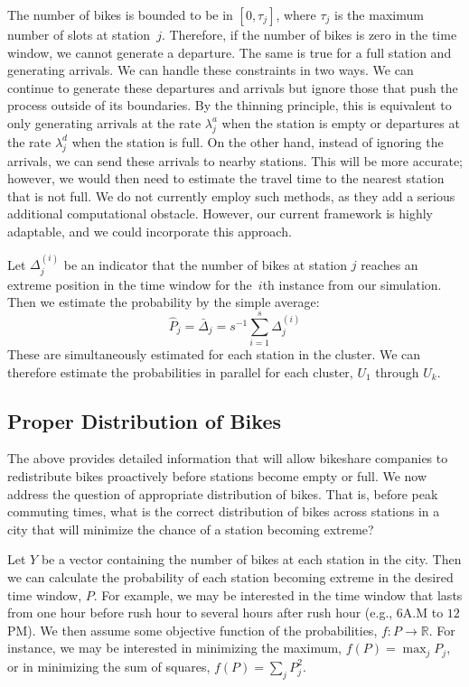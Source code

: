 \documentclass{acm_proc_article-sp}
\begin{document}
The number of bikes is bounded to be in $[0, \tau_j]$, where $\tau_j$ is the maximum number of slots at station~$j$.  Therefore, if the number of bikes is zero in the time window, we cannot generate a departure.  The same is true for a full station and generating arrivals.  We can handle these constraints in two ways.  We can continue to generate these departures and arrivals but ignore those that push the process outside of its boundaries.  By the thinning principle, this is equivalent to only generating arrivals at the rate $\lambda^{a}_j$ when the station is empty or departures at the rate $\lambda^{d}_j$ when the station is full.   On the other hand, instead of ignoring the arrivals, we can send these arrivals to nearby stations.  This will be more accurate; however, we would then need to estimate the travel time to the nearest station that is not full.  We do not currently employ such methods, as they add a serious additional computational obstacle.  However, our current framework is highly adaptable, and we could incorporate this approach.

Let $\Delta^{(i)}_j$ be an indicator that the number of bikes at station $j$ reaches an extreme position in the time window for the~$i$th instance from our simulation.  Then we estimate the probability by the simple average:
\begin{equation*}
\hat{P}_j = \bar{\Delta}_j = s^{-1} \sum_{i=1}^s \Delta^{(i)}_j
\end{equation*}
\noindent  These are simultaneously estimated for each station in the cluster.  We can therefore estimate the probabilities in parallel for each cluster, $U_1$ through $U_k$.

\subsection{Proper Distribution of Bikes}

The above provides detailed information that will allow bikeshare companies to redistribute bikes proactively before stations become empty or full.  We now address the question of appropriate distribution of bikes.  That is, before peak commuting times, what is the correct distribution of bikes across stations in a city that will minimize the chance of a station becoming extreme? 

Let $Y$ be a vector containing the number of bikes at each station in the city.  Then we can calculate the probability of each station becoming extreme in the desired time window, $P$.  For example, we may be interested in the time window that lasts from one hour before rush hour to several hours after rush hour (e.g., $6$A.M to $12$PM).  We then assume some objective function of the probabilities, $f: P \rightarrow \mathbb{R}$.  For instance, we may be interested in minimizing the maximum, $f(P) = \max_j P_j$, or in minimizing the sum of squares, $f(P) = \sum_j P_j^2$.  
\end{document}
